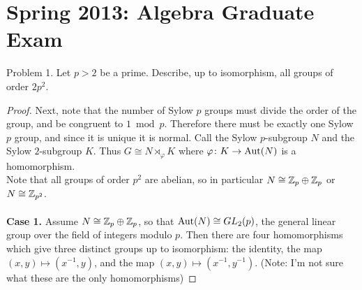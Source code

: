 \documentclass{article}
\begin{document}
\section{Spring 2013: Algebra Graduate Exam}
\label{sec:spring2013}


\begin{subsection}{Problem 1.}
  Let $p > 2$ be a prime. Describe, up to isomorphism, all groups of order $2p^2$.
\end{subsection}

\begin{proof}
  Next, note that the number of Sylow $p$ groups must divide the order of the
  group, and be congruent to $1 \bmod p$. Therefore there must be exactly one
  Sylow $p$ group, and since it is unique it is normal. Call the Sylow
  $p$-subgroup $N$ and the Sylow $2$-subgroup $K$.
  Thus $G \cong N \rtimes_\varphi K$ where ${\varphi \colon K \rightarrow \operatorname{Aut}(N)}$ is a homomorphism.
  \\
  Note that all groups of order $p^2$ are abelian, so in particular
  $N \cong \mathbb Z_p \oplus \mathbb Z_p$ or $N \cong \mathbb Z_{p^2}$.
  \\~\\
  \textbf{Case 1.} Assume $N \cong \mathbb Z_p \oplus \mathbb Z_p$, so that
  $\operatorname{Aut}(N) \cong GL_2(p)$, the general linear group over the field of integers
  modulo $p$. Then there are four homomorphisms which give three distinct groups
  up to isomorphism: the identity, the map $(x, y) \mapsto (x^{-1}, y)$,
  and the map $(x, y) \mapsto (x^{-1}, y^{-1})$.
  (Note: I'm not sure what these are the only homomorphisms)
\end{proof}
\end{document}
